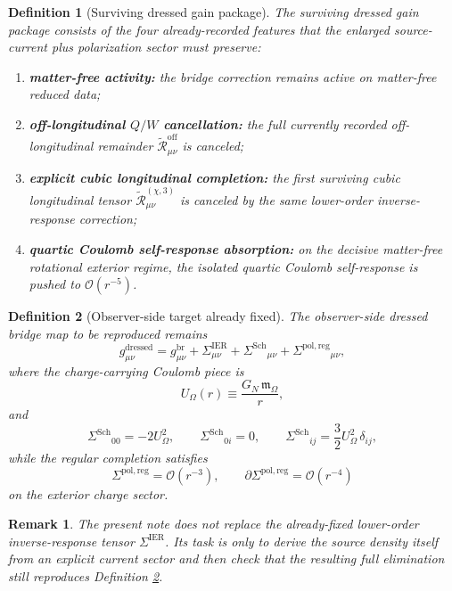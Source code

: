 \documentclass[11pt]{article}
\newcommand{\CoulPot}{U_\Omega}
\newcommand{\HamChargeOmega}{\mathfrak m_\Omega}
\newcommand{\SigmaIER}{\Sigma^{\mathrm{IER}}}
\newcommand{\SigmaDressSch}{\Sigma^{\mathrm{Sch}}}
\newcommand{\SigmaRegPol}{\Sigma^{\mathrm{pol,reg}}}
\newcommand{\ReOff}{\widetilde{\mathcal R}_{\mu\nu}^{\mathrm{off}}}
\newcommand{\ReLongThree}{\widetilde{\mathcal R}_{\mu\nu}^{(\chi,3)}}
\newtheorem{definition}{Definition}
\newtheorem{remark}{Remark}
\begin{document}
\begin{definition}[Surviving dressed gain package]
\label{def:gains}
The \emph{surviving dressed gain package} consists of the four already-recorded features that the enlarged source-current plus polarization sector must preserve:
\begin{enumerate}
    \item \textbf{matter-free activity:} the bridge correction remains active on matter-free reduced data;
    \item \textbf{off-longitudinal \(Q/W\) cancellation:} the full currently recorded off-longitudinal remainder \(\ReOff\) is canceled;
    \item \textbf{explicit cubic longitudinal completion:} the first surviving cubic longitudinal tensor \(\ReLongThree\) is canceled by the same lower-order inverse-response correction;
    \item \textbf{quartic Coulomb self-response absorption:} on the decisive matter-free rotational exterior regime, the isolated quartic Coulomb self-response is pushed to \(\mathcal O(r^{-5})\).
\end{enumerate}
\end{definition}

\begin{definition}[Observer-side target already fixed]
\label{def:target}
The observer-side dressed bridge map to be reproduced remains
\begin{equation}
g_{\mu\nu}^{\mathrm{dressed}}
=
g_{\mu\nu}^{\mathrm{br}}
+\SigmaIER_{\mu\nu}
+\SigmaDressSch{}_{\mu\nu}
+\SigmaRegPol{}_{\mu\nu},
\label{eq:targetmetric}
\end{equation}
where the charge-carrying Coulomb piece is
\begin{equation}
\CoulPot(r)\equiv \frac{G_N\,\HamChargeOmega}{r},
\label{eq:coulpot}
\end{equation}
and
\begin{equation}
\SigmaDressSch{}_{00}=-2\CoulPot^2,
\qquad
\SigmaDressSch{}_{0i}=0,
\qquad
\SigmaDressSch{}_{ij}=\frac32\CoulPot^2\,\delta_{ij},
\label{eq:schdress}
\end{equation}
while the regular completion satisfies
\begin{equation}
\SigmaRegPol=\mathcal O(r^{-3}),
\qquad
\partial\SigmaRegPol=\mathcal O(r^{-4})
\label{eq:reg}
\end{equation}
on the exterior charge sector.
\end{definition}

\begin{remark}
The present note does not replace the already-fixed lower-order inverse-response tensor \(\SigmaIER\). Its task is only to derive the source density itself from an explicit current sector and then check that the resulting full elimination still reproduces Definition \ref{def:target}.
\end{remark}
\end{document}
